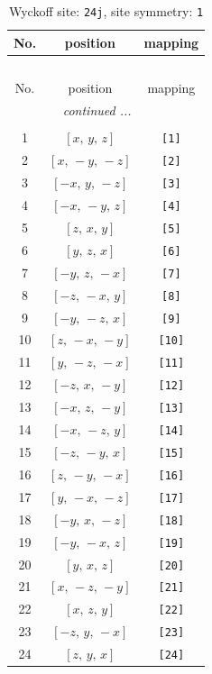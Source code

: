 \documentclass[fleqn,8pt]{jsarticle}
\begin{document}
\begin{longtable}{ccc}
\caption{Wyckoff site: {\tt 24j}, site symmetry: {\tt 1}}
 \\
 \hline \hline
No. & position & mapping \\ \hline \endfirsthead

\multicolumn{2}{l}{\tablename\ \thetable{}} \\
 \hline \hline
No. & position & mapping \\ \hline \endhead

 \hline \hline
\multicolumn{2}{r}{\footnotesize\it continued ...} \\ \endfoot

 \hline \hline
\multicolumn{2}{r}{} \\ \endlastfoot

1 & $\left[ x,\, y,\, z \right]$ & {\tt [1]} \\ \hline
2 & $\left[ x,\, - y,\, - z \right]$ & {\tt [2]} \\ \hline
3 & $\left[ - x,\, y,\, - z \right]$ & {\tt [3]} \\ \hline
4 & $\left[ - x,\, - y,\, z \right]$ & {\tt [4]} \\ \hline
5 & $\left[ z,\, x,\, y \right]$ & {\tt [5]} \\ \hline
6 & $\left[ y,\, z,\, x \right]$ & {\tt [6]} \\ \hline
7 & $\left[ - y,\, z,\, - x \right]$ & {\tt [7]} \\ \hline
8 & $\left[ - z,\, - x,\, y \right]$ & {\tt [8]} \\ \hline
9 & $\left[ - y,\, - z,\, x \right]$ & {\tt [9]} \\ \hline
10 & $\left[ z,\, - x,\, - y \right]$ & {\tt [10]} \\ \hline
11 & $\left[ y,\, - z,\, - x \right]$ & {\tt [11]} \\ \hline
12 & $\left[ - z,\, x,\, - y \right]$ & {\tt [12]} \\ \hline
13 & $\left[ - x,\, z,\, - y \right]$ & {\tt [13]} \\ \hline
14 & $\left[ - x,\, - z,\, y \right]$ & {\tt [14]} \\ \hline
15 & $\left[ - z,\, - y,\, x \right]$ & {\tt [15]} \\ \hline
16 & $\left[ z,\, - y,\, - x \right]$ & {\tt [16]} \\ \hline
17 & $\left[ y,\, - x,\, - z \right]$ & {\tt [17]} \\ \hline
18 & $\left[ - y,\, x,\, - z \right]$ & {\tt [18]} \\ \hline
19 & $\left[ - y,\, - x,\, z \right]$ & {\tt [19]} \\ \hline
20 & $\left[ y,\, x,\, z \right]$ & {\tt [20]} \\ \hline
21 & $\left[ x,\, - z,\, - y \right]$ & {\tt [21]} \\ \hline
22 & $\left[ x,\, z,\, y \right]$ & {\tt [22]} \\ \hline
23 & $\left[ - z,\, y,\, - x \right]$ & {\tt [23]} \\ \hline
24 & $\left[ z,\, y,\, x \right]$ & {\tt [24]} \\
\end{longtable}
\end{document}
